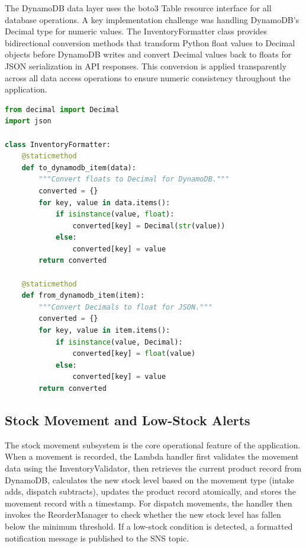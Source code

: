 \documentclass[conference]{IEEEtran}
\begin{document}
The DynamoDB data layer uses the boto3 Table resource interface for all database operations. A key implementation challenge was handling DynamoDB's Decimal type for numeric values. The InventoryFormatter class provides bidirectional conversion methods that transform Python float values to Decimal objects before DynamoDB writes and convert Decimal values back to floats for JSON serialization in API responses. This conversion is applied transparently across all data access operations to ensure numeric consistency throughout the application.

\begin{lstlisting}[language=Python, caption={DynamoDB Decimal conversion in InventoryFormatter}]
from decimal import Decimal
import json

class InventoryFormatter:
    @staticmethod
    def to_dynamodb_item(data):
        """Convert floats to Decimal for DynamoDB."""
        converted = {}
        for key, value in data.items():
            if isinstance(value, float):
                converted[key] = Decimal(str(value))
            else:
                converted[key] = value
        return converted

    @staticmethod
    def from_dynamodb_item(item):
        """Convert Decimals to float for JSON."""
        converted = {}
        for key, value in item.items():
            if isinstance(value, Decimal):
                converted[key] = float(value)
            else:
                converted[key] = value
        return converted
\end{lstlisting}

\subsection{Stock Movement and Low-Stock Alerts}

The stock movement subsystem is the core operational feature of the application. When a movement is recorded, the Lambda handler first validates the movement data using the InventoryValidator, then retrieves the current product record from DynamoDB, calculates the new stock level based on the movement type (intake adds, dispatch subtracts), updates the product record atomically, and stores the movement record with a timestamp. For dispatch movements, the handler then invokes the ReorderManager to check whether the new stock level has fallen below the minimum threshold. If a low-stock condition is detected, a formatted notification message is published to the SNS topic.
\end{document}
